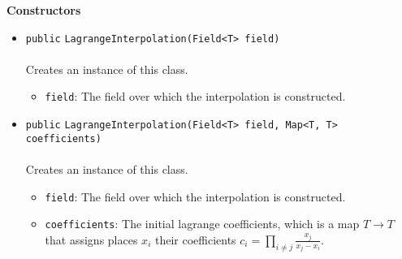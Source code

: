 \textbf{\sffamily Constructors}
\begin{itemize}
\item \lstinline|public| \lstinline|LagrangeInterpolation|\lstinline|(Field<T> field)|\\ \\[-0.6em]
Creates an instance of this class.
\begin{itemize}
\item \lstinline|field|: The field over which the interpolation is constructed.
\end{itemize}



\item \lstinline|public| \lstinline|LagrangeInterpolation|\lstinline|(Field<T> field, Map<T, T> coefficients)|\\ \\[-0.6em]
Creates an instance of this class.
\begin{itemize}
\item \lstinline|field|: The field over which the interpolation is constructed.
\item \lstinline|coefficients|: The initial lagrange coefficients, which is a map
 $T \to T$ that assigns places $x_i$ their coefficients
 $c_i = \prod_{i \neq j} \frac{x_j}{x_j - x_i}$.
\end{itemize}



\end{itemize}


